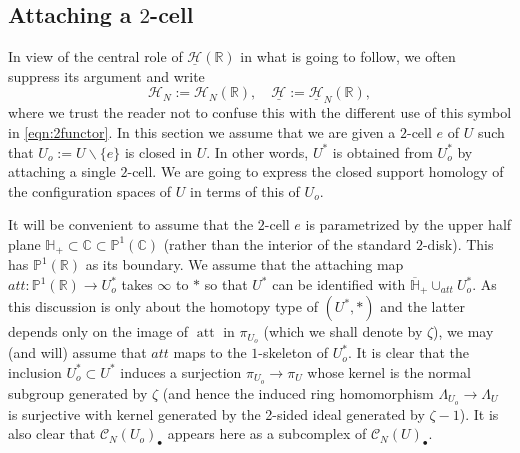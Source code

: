 \documentclass[12pt,letterpaper]{amsart}
\numberwithin{equation}{section}
\def\CC{{\mathbb C}}
\def\HH{{\mathbb H}}
\def\PP{{\mathbb P}}
\def\RR{{\mathbb R}}
\def\ssm{\smallsetminus}
\def\Hcal{{\mathcal H}}
\def\uHcal{{\underline\Hcal}}
\def\Cscr{{\mathscr C}}
\def\pt{{\scriptscriptstyle\bullet}}
\newcommand\att{\operatorname{att}}
\theoremstyle{remark}
\begin{document}
\subsection{Attaching a $2$-cell}\label{subsec:attaching2cell}
In view of the  central role  of $\uHcal(\RR)$ in what is going to follow, we often suppress its  argument and write
\begin{equation}\label{eqn:suppressR}
\Hcal_N:=\Hcal_N(\RR), \quad \uHcal:=\uHcal_N(\RR),  
\end{equation}
where we trust  the reader not to confuse this with the different use of this symbol in \eqref{eqn:2functor}.
In this section we assume that we are given a $2$-cell $e$ of $U$ such that $U_o:=U\ssm \{e\}$ is closed in $U$. In other words, $U^*$ is obtained 
from $U^*_o$ by attaching a single $2$-cell. We are going to  express the closed support homology of the configuration spaces of $U$ in terms of this of $U_o$.


It will be convenient to assume that the $2$-cell $e$ is parametrized by the upper half plane 
$\HH_+\subset \CC\subset \PP^1(\CC)$ (rather than the interior of the standard $2$-disk). This has  $\PP^1(\RR)$ as its boundary.  
We assume that the  attaching  map $att: \PP^1(\RR)\to U_o^*$ takes $\infty$ to $*$ so that $U^*$ can be identified with  
$\overline\HH_+\cup_{att} U_o^*$. As this discussion is only about the homotopy type of $(U^*,*)$ and the latter  depends only on the image of 
$\att$ in $\pi_{U_o}$ (which we shall denote by $\zeta$), we may (and will) assume that $att$ maps to the $1$-skeleton of $U_o^*$. 
It is clear that  the inclusion $U^*_o\subset U^*$ induces a surjection $\pi_{U_o}\to \pi_U$ whose kernel is the normal subgroup generated by $\zeta$
(and hence  the induced ring homomorphism  $\Lambda_{U_o}\to \Lambda_{U}$ is surjective with kernel generated by the 2-sided ideal generated by $\zeta-1$).
It is also clear that $\Cscr_N(U_o)_\pt$ appears here as a subcomplex of $\Cscr_N(U)_\pt$.  
\end{document}
